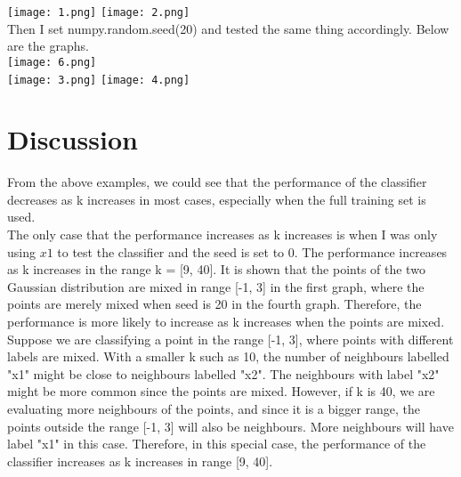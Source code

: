 \documentclass{article}
\begin{document}
\texttt{[image: 1.png]}
\texttt{[image: 2.png]}\\
Then I set numpy.random.seed(20) and tested the same thing accordingly. Below are the graphs.\\
\texttt{[image: 6.png]}\\
\texttt{[image: 3.png]}
\texttt{[image: 4.png]}\\

\section{Discussion}
From the above examples, we could see that the performance of the classifier decreases as k increases in most cases, especially when the full training set is used.\\

\noindent
The only case that the performance increases as k increases is when I was only using $x1$ to test the classifier and the seed is set to 0. The performance increases as k increases in the range k = [9, 40]. It is shown that the points of the two Gaussian distribution are mixed in range [-1, 3] in the first graph, where the points are merely mixed when seed is 20 in the fourth graph. Therefore, the performance is more likely to increase as k increases when the points are mixed.\\

\noindent
Suppose we are classifying a point in the range [-1, 3], where points with different labels are mixed. With a smaller k such as 10, the number of neighbours labelled "x1" might be close to neighbours labelled "x2". The neighbours with label "x2" might be more common since the points are mixed. However, if k is 40, we are evaluating more neighbours of the points, and since it is a bigger range, the points outside the range [-1, 3] will also be neighbours. More neighbours will have label "x1" in this case. Therefore, in this special case, the performance of the classifier increases as k increases in range [9, 40].\\
\end{document}
